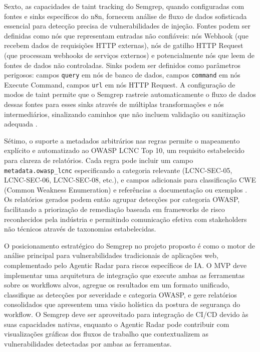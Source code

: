 \documentclass{sftex}
\begin{document}
Sexto, as capacidades de taint tracking do Semgrep, quando configuradas com fontes e sinks específicos do n8n, fornecem análise de fluxo de dados sofisticada essencial para detecção precisa de vulnerabilidades de injeção. Fontes podem ser definidas como nós que representam entradas não confiáveis: nós Webhook (que recebem dados de requisições HTTP externas), nós de gatilho HTTP Request (que processam webhooks de serviços externos) e potencialmente nós que leem de fontes de dados não controladas. Sinks podem ser definidos como parâmetros perigosos: campos \texttt{query} em nós de banco de dados, campos \texttt{command} em nós Execute Command, campos \texttt{url} em nós HTTP Request. A configuração de modos de taint permite que o Semgrep rastreie automaticamente o fluxo de dados dessas fontes para esses sinks através de múltiplas transformações e nós intermediários, sinalizando caminhos que não incluem validação ou sanitização adequada \cite{prototype_pollution}.

Sétimo, o suporte a metadados arbitrários nas regras permite o mapeamento explícito e automatizado ao OWASP LCNC Top 10, um requisito estabelecido para clareza de relatórios. Cada regra pode incluir um campo \texttt{metadata.owasp\_lcnc} especificando a categoria relevante (LCNC-SEC-05, LCNC-SEC-06, LCNC-SEC-08, etc.), e campos adicionais para classificação CWE (Common Weakness Enumeration) e referências a documentação ou exemplos \cite{owasp_lcnc_top10} \cite{owasp_lcnc_sec_05} \cite{owasp_lcnc_sec_06} \cite{owasp_lcnc_sec_08}. Os relatórios gerados podem então agrupar detecções por categoria OWASP, facilitando a priorização de remediação baseada em frameworks de risco reconhecidos pela indústria e permitindo comunicação efetiva com stakeholders não técnicos através de taxonomias estabelecidas.

O posicionamento estratégico do Semgrep no projeto proposto é como o motor de análise principal para vulnerabilidades tradicionais de aplicações web, complementado pelo Agentic Radar para riscos específicos de IA. O MVP deve implementar uma arquitetura de integração que execute ambas as ferramentas sobre os workflows alvos, agregue os resultados em um formato unificado, classifique as detecções por severidade e categoria OWASP, e gere relatórios consolidados que apresentem uma visão holística da postura de segurança do workflow. O Semgrep deve ser aproveitado para integração de CI/CD devido às suas capacidades nativas, enquanto o Agentic Radar pode contribuir com visualizações gráficas dos fluxos de trabalho que contextualizem as vulnerabilidades detectadas por ambas as ferramentas.
\end{document}

